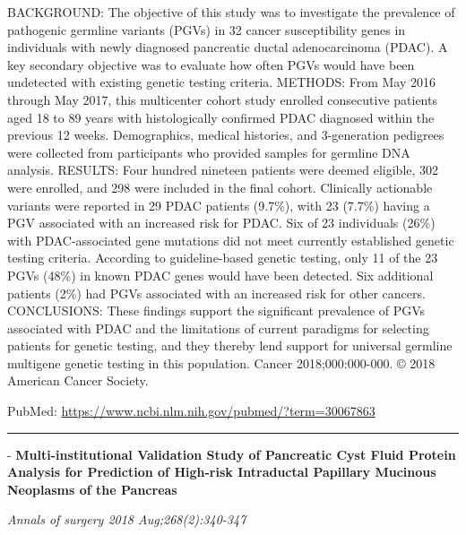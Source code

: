 \documentclass[]{article}
\begin{document}
BACKGROUND: The objective of this study was to investigate the
prevalence of pathogenic germline variants (PGVs) in 32 cancer
susceptibility genes in individuals with newly diagnosed pancreatic
ductal adenocarcinoma (PDAC). A key secondary objective was to evaluate
how often PGVs would have been undetected with existing genetic testing
criteria. METHODS: From May 2016 through May 2017, this multicenter
cohort study enrolled consecutive patients aged 18 to 89 years with
histologically confirmed PDAC diagnosed within the previous 12 weeks.
Demographics, medical histories, and 3-generation pedigrees were
collected from participants who provided samples for germline DNA
analysis. RESULTS: Four hundred nineteen patients were deemed eligible,
302 were enrolled, and 298 were included in the final cohort. Clinically
actionable variants were reported in 29 PDAC patients (9.7\%), with 23
(7.7\%) having a PGV associated with an increased risk for PDAC. Six of
23 individuals (26\%) with PDAC-associated gene mutations did not meet
currently established genetic testing criteria. According to
guideline-based genetic testing, only 11 of the 23 PGVs (48\%) in known
PDAC genes would have been detected. Six additional patients (2\%) had
PGVs associated with an increased risk for other cancers. CONCLUSIONS:
These findings support the significant prevalence of PGVs associated
with PDAC and the limitations of current paradigms for selecting
patients for genetic testing, and they thereby lend support for
universal germline multigene genetic testing in this population. Cancer
2018;000:000-000. © 2018 American Cancer Society.

PubMed: \url{https://www.ncbi.nlm.nih.gov/pubmed/?term=30067863}

{}

{}

\begin{center}\rule{0.5\linewidth}{\linethickness}\end{center}

 - \textbf{Multi-institutional Validation Study of Pancreatic Cyst Fluid
Protein Analysis for Prediction of High-risk Intraductal Papillary
Mucinous Neoplasms of the Pancreas}

\emph{Annals of surgery 2018 Aug;268(2):340-347}
\end{document}
